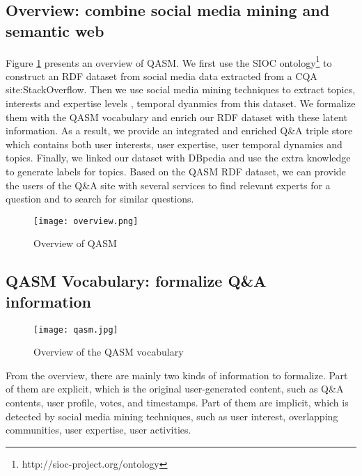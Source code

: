 \subsection{Overview: combine social media mining and semantic web}
Figure \ref{fig:overview} presents an overview of QASM. We first use the SIOC ontology\footnote{http://sioc-project.org/ontology} to construct an RDF dataset from social media data extracted from a CQA site:StackOverflow. Then we use social media mining techniques to extract topics, interests and expertise levels , temporal dyanmics from this dataset. We formalize them with the QASM vocabulary and enrich our RDF dataset with these latent information. As a result, we provide an integrated and enriched Q\&A triple store which contains both user interests, user expertise, user temporal dynamics and topics. Finally, we linked our dataset with DBpedia and use the extra knowledge to generate labels for topics. Based on the QASM RDF dataset, we can provide the users of the Q\&A site with several services to find relevant experts for a question and to search for similar questions.

\begin{figure}%
\centering
\texttt{[image: overview.png]}  
\caption{Overview of QASM}
\label{fig:overview} 
\end{figure}

\subsection{QASM Vocabulary: formalize Q\&A information}
\begin{sidewaysfigure}
\centering
\texttt{[image: qasm.jpg]}
\caption{Overview of the QASM vocabulary}
\label{fig:coreontology} 
\end{sidewaysfigure}

From the overview, there are mainly two kinds of information to formalize. Part of them are explicit, which is the original user-generated content, such as Q\&A contents, user profile, votes, and timestamps. Part of them are implicit, which is detected by social media mining techniques, such as user interest, overlapping communities, user expertise, user activities. 

